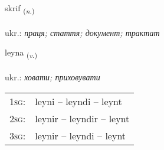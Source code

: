 \documentclass[frontgrid, backgrid]{flacards}\usepackage[]{graphicx}\usepackage[]{xcolor}
\begin{document}
\renewcommand{\flhead}{\vskip5pt \fboxsep=0pt {\small\bfseries\footnotesize Nafnorð | іменник}}
\renewcommand{\fcfoot}{\vskip5pt \fboxsep=0pt \hspace{2pt}{\small\bfseries\footnotesize 2K}}

\renewcommand{\blhead}{\vskip5pt {\small\bfseries\footnotesize Nafnorð | іменник }}
\renewcommand{\bcfoot}{\vskip5pt \hspace{2pt}{\small\bfseries\footnotesize 2K}}


{skrif \small{\textsubscript{(\textit{n.})}} \\[1ex] %
\textphonetic{[skrɪːv]} \\
ukr.: \emph{праця; стаття; документ; трактат} \\  [2ex]
\renewcommand*{\arraystretch}{0.8}
}

\renewcommand{\flhead}{\vskip5pt \fboxsep=0pt {\small\bfseries\footnotesize Sagnorð | дієслово}}
\renewcommand{\fcfoot}{\vskip5pt \fboxsep=0pt \hspace{2pt}{\small\bfseries\footnotesize 2K}}

\renewcommand{\blhead}{\vskip5pt {\small\bfseries\footnotesize Sagnorð | дієслово }}
\renewcommand{\bcfoot}{\vskip5pt \hspace{2pt}{\small\bfseries\footnotesize 2K}}


{leyna \small{\textsubscript{(\textit{v.})}} \\[1ex] %
\textphonetic{[leiːna]} \\
ukr.: \emph{ховати; приховувати} \\  [2ex]
\renewcommand*{\arraystretch}{0.8}
\begin{tabular}{p{1cm}l}
\textsc{1sg}: & leyni -- leyndi -- leynt \\ 
\textsc{2sg}: & leynir -- leyndir -- leynt \\ 
\textsc{3sg}: & leynir -- leyndi -- leynt \\ 
\end{tabular}
}
\end{document}
